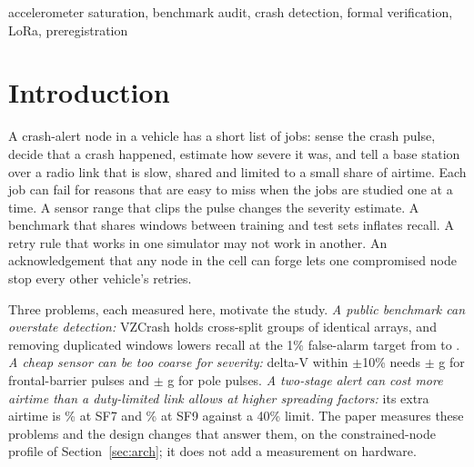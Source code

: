 \documentclass{ieeeaccess}
\begin{document}
\begin{keywords}
accelerometer saturation, benchmark audit, crash detection, formal verification, LoRa, preregistration
\end{keywords}

\titlepgskip=-15pt
\maketitle

\section{Introduction}
\label{sec:intro}
A crash-alert node in a vehicle has a short list of jobs: sense the crash pulse, decide that a crash happened, estimate how severe it was, and tell a base station over a radio link that is slow, shared and limited to a small share of airtime. Each job can fail for reasons that are easy to miss when the jobs are studied one at a time. A sensor range that clips the pulse changes the severity estimate. A benchmark that shares windows between training and test sets inflates recall. A retry rule that works in one simulator may not work in another. An acknowledgement that any node in the cell can forge lets one compromised node stop every other vehicle's retries.

Three problems, each measured here, motivate the study. \emph{A public benchmark can overstate detection:} VZCrash holds \VzGroups{} cross-split groups of identical arrays, and removing duplicated windows lowers recall at the 1\% false-alarm target from \VzROneSup{} to \VzROneNear{}. \emph{A cheap sensor can be too coarse for severity:} delta-V within $\pm$10\% needs $\pm$\ModeFrontReal{} g for frontal-barrier pulses and $\pm$\ModePoleReal{} g for pole pulses. \emph{A two-stage alert can cost more airtime than a duty-limited link allows at higher spreading factors:} its extra airtime is \NsAirHiSfSeven\% at SF7 and \NsAirHiSfNine\% at SF9 against a 40\% limit. The paper measures these problems and the design changes that answer them, on the constrained-node profile of Section~\ref{sec:arch}; it does not add a measurement on hardware.
\end{document}
